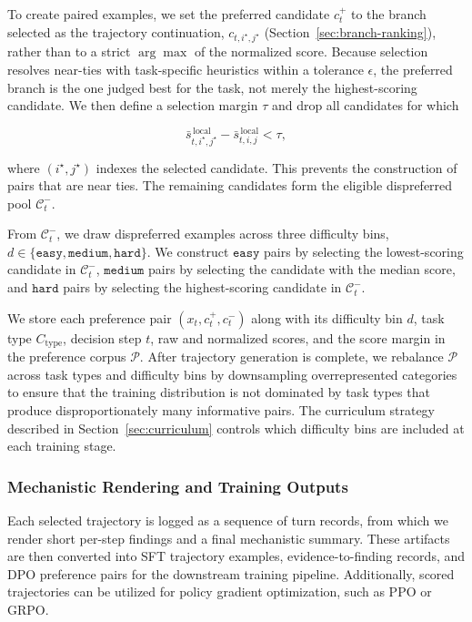 \documentclass[thesis,letterpaper,12pt]{utthesis}
\begin{document}
To create paired examples, we set the preferred candidate $c_t^+$ to the branch selected as the trajectory continuation, $c_{t,i^\star, j^\star}$ (Section~\ref{sec:branch-ranking}), rather than to a strict $\arg\max$ of the normalized score. Because selection resolves near-ties with task-specific heuristics within a tolerance $\epsilon$, the preferred branch is the one judged best for the task, not merely the highest-scoring candidate. We then define a selection margin $\tau$ and drop all candidates for which

\[
    \bar{s}^{\,\text{local}}_{t,i^\star,j^\star} - \bar{s}^{\,\text{local}}_{t,i,j} < \tau,
\]

where $(i^\star, j^\star)$ indexes the selected candidate. This prevents the construction of pairs that are near ties. The remaining candidates form the eligible dispreferred pool $\mathcal{C}_t^{-}$.

From $\mathcal{C}_t^{-}$, we draw dispreferred examples across three difficulty bins, $d \in \{\texttt{easy}, \texttt{medium}, \texttt{hard}\}$. We construct $\texttt{easy}$ pairs by selecting the lowest-scoring candidate in $\mathcal{C}_t^{-}$, $\texttt{medium}$ pairs by selecting the candidate with the median score, and $\texttt{hard}$ pairs by selecting the highest-scoring candidate in $\mathcal{C}_t^{-}$.

We store each preference pair $(x_t, c_t^+, c_t^-)$ along with its difficulty bin $d$, task type $C_{\text{type}}$, decision step $t$, raw and normalized scores, and the score margin in the preference corpus $\mathcal{P}$. After trajectory generation is complete, we rebalance $\mathcal{P}$ across task types and difficulty bins by downsampling overrepresented categories to ensure that the training distribution is not dominated by task types that produce disproportionately many informative pairs. The curriculum strategy described in Section~\ref{sec:curriculum} controls which difficulty bins are included at each training stage.

\subsubsection{Mechanistic Rendering and Training Outputs}
Each selected trajectory is logged as a sequence of turn records, from which we render short per-step findings and a final mechanistic summary. These artifacts are then converted into SFT trajectory examples, evidence-to-finding records, and DPO preference pairs for the downstream training pipeline. Additionally, scored trajectories can be utilized for policy gradient optimization, such as PPO or GRPO.
\end{document}

